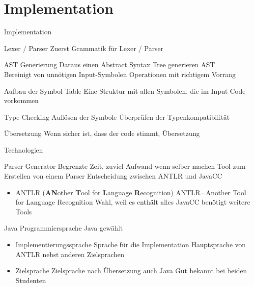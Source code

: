 \section{Implementation}
\begin{frame}[t]{Implementation}

	\begin{bigitemize}[<+->]{3mm}
		\item Lexer / Parser
		 {Zuerst Grammatik für Lexer / Parser}
		\item AST Generierung
		 {Daraus einen Abstract Syntax Tree generieren}
		 {AST = Bereinigt von unnötigen Input-Symbolen}
		 {Operationen mit richtigem Vorrang}
		\item Aufbau der Symbol Table
		 {Eine Struktur mit allen Symbolen, die im Input-Code vorkommen}
		\item Type Checking
		 {Auflösen der Symbole}
		 {Überprüfen der Typenkompatibilität}
		\item Übersetzung
		 {Wenn sicher ist, dass der code stimmt, Übersetzung}
	\end{bigitemize}

\end{frame}

\begin{frame}[t]{Technologien}
	\begin{bigitemize}[<+->]{3mm}
		\item Parser Generator
		 {Begrenzte Zeit, zuviel Aufwand wenn selber machen}
		 {Tool zum Erstellen von einem Parser}
		 {Entscheidung zwischen ANTLR und JavaCC}
		\begin{itemize}
			\item ANTLR (\textbf{AN}other \textbf{T}ool for \textbf{L}anguage \textbf{R}ecognition)
			 {ANTLR=Another Tool for Language Recognition}
			 {Wahl, weil es enthält alles}
			 {JavaCC benötigt weitere Tools}
		\end{itemize}

		\item Java 
		 {Programmiersprache Java gewählt}
		\begin{itemize}
			\item Implementierungssprache 
			 {Sprache für die Implementation}
			 {Hauptsprache von ANTLR nebst anderen Zielsprachen}
			\item Zielsprache
			 {Zielsprache nach Übersetzung auch Java}
			 {Gut bekannt bei beiden Studenten}
		\end{itemize}
	\end{bigitemize}
\end{frame}

